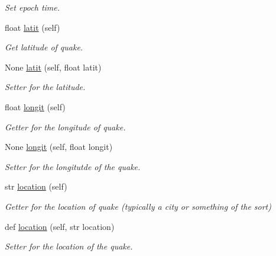 \begin{DoxyCompactItemize}
\begin{DoxyCompactList}\small\item\em Set epoch time. \end{DoxyCompactList}\item 
float \mbox{\hyperlink{classbridges_1_1data__src__dependent_1_1earthquake__usgs_1_1_earthquake_u_s_g_s_a817efb286a9963009b9424d790cc52c0}{latit}} (self)
\begin{DoxyCompactList}\small\item\em Get latitude of quake. \end{DoxyCompactList}\item 
None \mbox{\hyperlink{classbridges_1_1data__src__dependent_1_1earthquake__usgs_1_1_earthquake_u_s_g_s_a4291c16787b8007ee1d7ad2a5813b955}{latit}} (self, float latit)
\begin{DoxyCompactList}\small\item\em Setter for the latitude. \end{DoxyCompactList}\item 
float \mbox{\hyperlink{classbridges_1_1data__src__dependent_1_1earthquake__usgs_1_1_earthquake_u_s_g_s_ad801b1d84c835053850938da58785cb9}{longit}} (self)
\begin{DoxyCompactList}\small\item\em Getter for the longitude of quake. \end{DoxyCompactList}\item 
None \mbox{\hyperlink{classbridges_1_1data__src__dependent_1_1earthquake__usgs_1_1_earthquake_u_s_g_s_a28e214f93ebbd9982eec3105e278a38a}{longit}} (self, float longit)
\begin{DoxyCompactList}\small\item\em Setter for the longitutde of the quake. \end{DoxyCompactList}\item 
str \mbox{\hyperlink{classbridges_1_1data__src__dependent_1_1earthquake__usgs_1_1_earthquake_u_s_g_s_ad4ce59de726463950bf2101eaf72f0af}{location}} (self)
\begin{DoxyCompactList}\small\item\em Getter for the location of quake (typically a city or something of the sort) \end{DoxyCompactList}\item 
def \mbox{\hyperlink{classbridges_1_1data__src__dependent_1_1earthquake__usgs_1_1_earthquake_u_s_g_s_a271e8d69d057e5249e404af4026efb53}{location}} (self, str location)
\begin{DoxyCompactList}\small\item\em Setter for the location of the quake. \end{DoxyCompactList}\item 

\end{DoxyCompactItemize}
